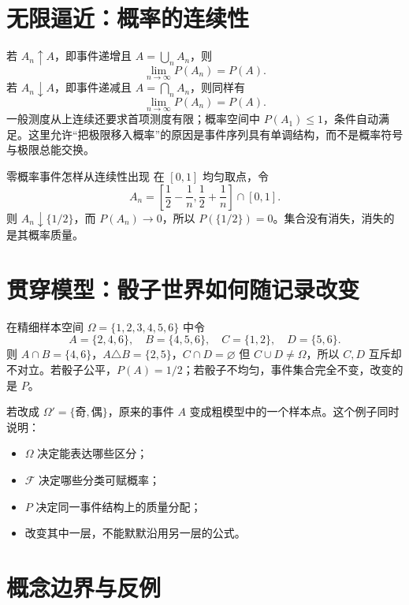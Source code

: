 \documentclass[11pt,a4paper]{ctexart}
\begin{document}
\section{无限逼近：概率的连续性}

若 $A_n\uparrow A$，即事件递增且 $A=\bigcup_nA_n$，则
\[
\lim_{n\to\infty}P(A_n)=P(A).
\]
若 $A_n\downarrow A$，即事件递减且 $A=\bigcap_nA_n$，则同样有
\[
\lim_{n\to\infty}P(A_n)=P(A).
\]
一般测度从上连续还要求首项测度有限；概率空间中 $P(A_1)\le1$，条件自动满足。这里允许“把极限移入概率”的原因是事件序列具有单调结构，而不是概率符号与极限总能交换。

\begin{examplebox}{零概率事件怎样从连续性出现}
在 $[0,1]$ 均匀取点，令
\[
A_n=\left[\frac12-\frac1n,\frac12+\frac1n\right]\cap[0,1].
\]
则 $A_n\downarrow\{1/2\}$，而 $P(A_n)\to0$，所以 $P(\{1/2\})=0$。集合没有消失，消失的是其概率质量。
\end{examplebox}

\section{贯穿模型：骰子世界如何随记录改变}

在精细样本空间 $\Omega=\{1,2,3,4,5,6\}$ 中令
\[
A=\{2,4,6\},\quad B=\{4,5,6\},\quad C=\{1,2\},\quad D=\{5,6\}.
\]
则 $A\cap B=\{4,6\}$，$A\triangle B=\{2,5\}$，$C\cap D=\varnothing$ 但 $C\cup D\ne\Omega$，所以 $C,D$ 互斥却不对立。若骰子公平，$P(A)=1/2$；若骰子不均匀，事件集合完全不变，改变的是 $P$。

若改成 $\Omega'=\{\text{奇},\text{偶}\}$，原来的事件 $A$ 变成粗模型中的一个样本点。这个例子同时说明：
\begin{itemize}
  \item $\Omega$ 决定能表达哪些区分；
  \item $\mathcal F$ 决定哪些分类可赋概率；
  \item $P$ 决定同一事件结构上的质量分配；
  \item 改变其中一层，不能默默沿用另一层的公式。
\end{itemize}

\section{概念边界与反例}
\end{document}
